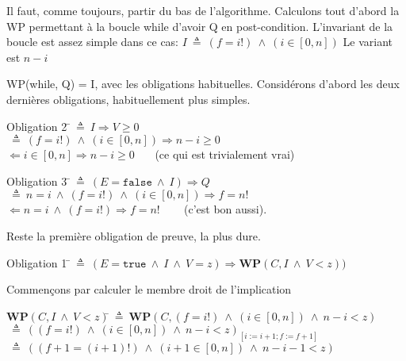\documentclass[10pt]{article}\usepackage[correction,nu]{esial}
\begin{document}
\newcommand{\eq}{ \:\triangleq\: }
\newcommand{\ET}{ \:\wedge\: }
\begin{Reponse}
  Il faut, comme toujours, partir du bas de l'algorithme. Calculons tout
  d'abord la WP permettant à la boucle while d'avoir Q en post-condition.
%
  L'invariant de la boucle est assez simple dans ce cas: $I\eq (f=i!)\ET (i\in[0,n])$
  Le variant est $n-i$

  \medskip\noindent 
  WP(while, Q) = I, avec les obligations habituelles. Considérons d'abord les
  deux dernières obligations, habituellement plus simples.

  \medskip\noindent
  \begin{tabbing}
  Obligation 2 \=$\eq I\Rightarrow V\geq 0$\\
  \>$\eq (f=i!)\ET (i\in[0,n])\Rightarrow n-i\geq 0$\\
  \>$\Leftarrow i\in[0,n]\Rightarrow n-i\geq 0$ ~~~(ce qui est trivialement
  vrai)\\
  \end{tabbing}

  \medskip\noindent
  \begin{tabbing}
  Obligation 3 \=$\eq (E=\mathtt{false}\ET I) \Rightarrow Q$\\
  \>$\eq n=i \ET (f=i!)\ET (i\in[0,n]) \Rightarrow f=n!$\\
  \>$\Leftarrow n=i \ET (f=i!) \Rightarrow f=n!$ ~~~ (c'est bon aussi).
  \end{tabbing}
  Reste la première obligation de preuve, la plus dure.

  \medskip\noindent
  \begin{tabbing}
  Obligation 1 \=$\eq (E=\mathtt{true}\ET I\ET V=z) \Rightarrow
    \mathbf{WP}(C,I\ET V<z))$
  \end{tabbing}

  Commençons par calculer le membre droit de l'implication
  \begin{tabbing}
    $\mathbf{WP}(C,I\ET V<z)$\=$\eq \mathbf{WP}(C,(f=i!)\ET
    (i\in[0,n])\ET n-i<z) $\\
    \>$\eq \left((f=i!)\ET (i\in[0,n])\ET n-i<z\right)_{[i:=i+1;f:=f+1]}$\\
    \>$\eq \left((f+1=(i+1)!)\ET (i+1\in[0,n])\ET n-i-1<z\right)$
  \end{tabbing}


\end{Reponse}
\end{document}
